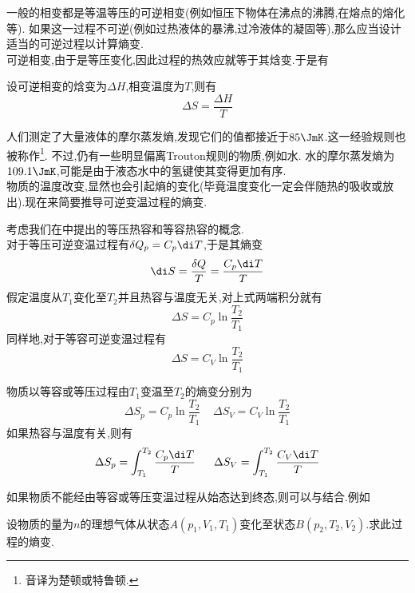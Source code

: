 \documentclass{ctexart}
\begin{document}
\indent 一般的相变都是等温等压的可逆相变(例如恒压下物体在沸点的沸腾,在熔点的熔化等).%
如果这一过程不可逆(例如过热液体的暴沸,过冷液体的凝固等),那么应当设计适当的可逆过程以计算熵变.\\
\indent 可逆相变,由于是等压变化,因此过程的热效应就等于其焓变.于是有
\begin{theorem}[3C.2.1 可逆相变的熵变]
    设可逆相变的焓变为$\Delta H$,相变温度为$T$,则有
    \[\Delta S=\dfrac{\Delta H}{T}\]

\end{theorem}
人们测定了大量液体的摩尔蒸发熵,发现它们的值都接近于$85\JmK$.这一经验规则也被称作\footnote{音译为楚顿或特鲁顿.}.%
不过,仍有一些明显偏离Trouton规则的物质,例如水.%
水的摩尔蒸发熵为$109.1\JmK$,可能是由于液态水中的氢键使其变得更加有序.\vspace{12pt}\\
\indent 物质的温度改变,显然也会引起熵的变化(毕竟温度变化一定会伴随热的吸收或放出).现在来简要推导可逆变温过程的熵变.
\begin{derivation}
    考虑我们在中提出的等压热容和等容热容的概念.\\
    对于等压可逆变温过程有$\delta Q_p=C_p\di T$,于是其熵变
    \[\di S=\dfrac{\delta Q}{T}=\dfrac{C_p\di T}{T}\]
    假定温度从$T_1$变化至$T_2$并且热容与温度无关,对上式两端积分就有
    \[\Delta S=C_p\ln\dfrac{T_2}{T_1}\]
    同样地,对于等容可逆变温过程有
    \[\Delta S=C_V\ln\dfrac{T_2}{T_1}\]

\end{derivation}
\begin{theorem}[3C.3.1 等容或等压变温过程的熵变]
    物质以等容或等压过程由$T_1$变温至$T_2$的熵变分别为
    \[\Delta S_p=C_p\ln\dfrac{T_2}{T_1}\ \ \ \ \ \Delta S_V=C_V\ln\dfrac{T_2}{T_1}\]
    如果热容与温度有关,则有
    \[\Delta S_p=\int_{T_1}^{T_2}\dfrac{C_p\di T}{T}\ \ \ \ \ \Delta S_V=\int_{T_1}^{T_2}\dfrac{C_V\di T}{T}\]

\end{theorem}
如果物质不能经由等容或等压变温过程从始态达到终态,则可以与结合.例如
\begin{problem}[3C.3.2]
    设物质的量为$n$的理想气体从状态$A\left(p_1,V_1,T_1\right)$变化至状态$B\left(p_2,T_2,V_2\right)$.求此过程的熵变.
\end{problem}
\end{document}
